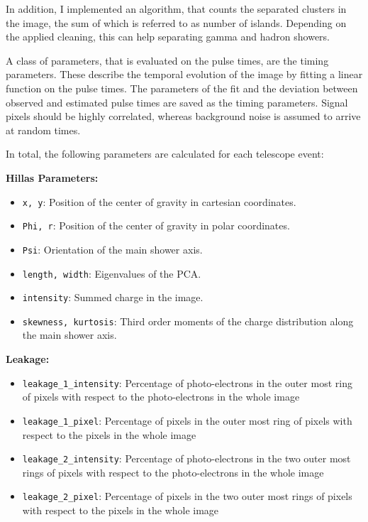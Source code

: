 In addition, I implemented an algorithm, that counts the separated clusters in the image,
the sum of which is referred to as number of islands. Depending on the applied 
cleaning, this can help separating gamma and hadron showers.

A class of parameters, that is evaluated on the pulse times, are the timing
parameters. These describe the temporal evolution of the image by fitting
a linear function on the pulse times. The parameters of the fit and the deviation
between observed and estimated pulse times are saved as the timing parameters.
Signal pixels should be highly correlated, whereas background noise 
is assumed to arrive at random times.

In total, the following parameters are calculated for each telescope event:

\textbf{Hillas Parameters:}

\begin{itemize}
    \item{\texttt{x, y}: Position of the center of gravity in cartesian coordinates.}
    \item{\texttt{Phi, r}: Position of the center of gravity in polar coordinates.}
    \item{\texttt{Psi}: Orientation of the main shower axis.}
    \item{\texttt{length, width}: Eigenvalues of the PCA.}
    \item{\texttt{intensity}: Summed charge in the image.}
    \item{\texttt{skewness, kurtosis}: Third order moments of the charge distribution along the main shower axis.}
\end{itemize}

\textbf{Leakage:}

\begin{itemize}
    \item{\texttt{leakage\_1\_intensity}: Percentage of photo-electrons in the outer most ring of pixels with respect to the photo-electrons in the whole image}
    \item{\texttt{leakage\_1\_pixel}: Percentage of pixels in the outer most ring of pixels with respect to the pixels in the whole image}
    \item{\texttt{leakage\_2\_intensity}: Percentage of photo-electrons in the two outer most rings of pixels with respect to the photo-electrons in the whole image}
    \item{\texttt{leakage\_2\_pixel}: Percentage of pixels in the two outer most rings of pixels with respect to the pixels in the whole image}
\end{itemize}

